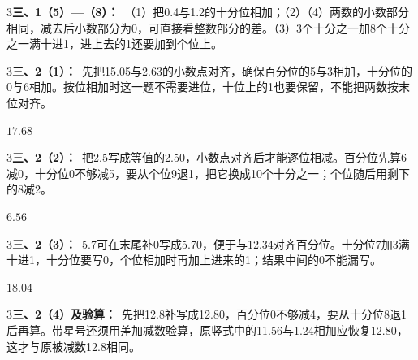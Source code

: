 \documentclass[multi=snippet,border={5bp 20bp 5bp 5bp}]{standalone}
\newenvironment{snippet}[3]{\begin{minipage}{#1bp}\color{answerred}\fontsize{#2}{#3}\selectfont\raggedright}{\end{minipage}}
\begin{document}
\begin{snippet}{505}{11.5}{14}\begin{multicols}{3}\raggedcolumns \textbf{三、1（5）—（8）：}\ （1）把0.4与1.2的十分位相加；（2）（4）两数的小数部分相同，减去后小数部分为0，可直接看整数部分的差。（3）3个十分之一加8个十分之一满十进1，进上去的1还要加到个位上。\end{multicols}\end{snippet}
\begin{snippet}{505}{11.5}{14}\begin{multicols}{3}\raggedcolumns \textbf{三、2（1）：}\ 先把15.05与2.63的小数点对齐，确保百分位的5与3相加，十分位的0与6相加。按位相加时这一题不需要进位，十位上的1也要保留，不能把两数按末位对齐。\end{multicols}\end{snippet}
\begin{snippet}{24.25}{10}{14}\SourceSans\setlength{\mathindent}{2bp}\(17.68\)\end{snippet}
\begin{snippet}{505}{11.5}{14}\begin{multicols}{3}\raggedcolumns \textbf{三、2（2）：}\ 把2.5写成等值的2.50，小数点对齐后才能逐位相减。百分位先算6减0，十分位0不够减5，要从个位9退1，把它换成10个十分之一；个位随后用剩下的8减2。\end{multicols}\end{snippet}
\begin{snippet}{24.25}{10}{14}\SourceSans\setlength{\mathindent}{2bp}\(6.56\)\end{snippet}
\begin{snippet}{505}{11.5}{14}\begin{multicols}{3}\raggedcolumns \textbf{三、2（3）：}\ 5.7可在末尾补0写成5.70，便于与12.34对齐百分位。十分位7加3满十进1，十分位要写0，个位相加时再加上进来的1；结果中间的0不能漏写。\end{multicols}\end{snippet}
\begin{snippet}{24.75}{10}{14}\SourceSans\setlength{\mathindent}{2bp}\(18.04\)\end{snippet}
\begin{snippet}{505}{11.5}{14}\begin{multicols}{3}\raggedcolumns \textbf{三、2（4）及验算：}\ 先把12.8补写成12.80，百分位0不够减4，要从十分位8退1后再算。带星号还须用差加减数验算，原竖式中的11.56与1.24相加应恢复12.80，这才与原被减数12.8相同。\end{multicols}\end{snippet}
\end{document}

